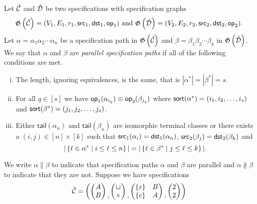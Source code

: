 \begin{definition}
Let $\check{\mathcal{C}}$ and $\check{\mathcal{D}}$ be two specifications with specification graphs 
\[
\mathfrak{G}\left(\check{\mathcal{C}}\right)=(V_1,E_1,r_1,\textsf{src}_1,\textsf{dst}_1,\textsf{op}_1) \text{ and } \mathfrak{G}\left(\check{\mathcal{D}}\right) = (V_2,E_2,r_2,\textsf{src}_2,\textsf{dst}_2,\textsf{op}_2).
\]
Let $\alpha=\alpha_1\alpha_2 \dotsm \alpha_n$ be a specification path in $\mathfrak{G}\left(\check{\mathcal{C}}\right)$ and $\beta=\beta_1\beta_2 \dotsm \beta_k$ in $\mathfrak{G}\left(\check{\mathcal{D}}\right)$. We say that $\alpha$ and $\beta$ are \emph{parallel specification paths} if all of the following conditions are met.
\begin{enumerate}[i.]
    \item The length, ignoring equivalences, is the same, that is $|\alpha^\ast| = |\beta^\ast| = s$.
    \item For all $q\in[s]$ we have $\textsf{op}_1(\alpha_{i_q}) \equiv \textsf{op}_2(\beta_{j_q})$ where $\textsf{sort}(\alpha^\ast) = (i_1,i_2,\dotsc,i_s)$ and $\textsf{sort}(\beta^\ast) = (j_1,j_2,\dotsc,j_s)$.
    \item Either $\textsf{tail}(\alpha_n)$ and $\textsf{tail}(\beta_n)$ are isomorphic terminal classes or there exists a $(i,j) \in [n] \times [k]$ such that $\textsf{src}_1(\alpha_i) = \textsf{dst}_1(\alpha_n)$, $\textsf{src}_2(\beta_j) = \textsf{dst}_2(\beta_k)$ and
    \[
        |\left\{\ell \in \alpha^\ast \mid i \leq \ell \leq n\right\}| = |\left\{\ell \in \beta^\ast \mid j \leq \ell \leq k\right\}|.
    \]
\end{enumerate}
\end{definition}
We write $\alpha \parallel \beta$ to indicate that specification paths $\alpha$ and $\beta$ are parallel and $\alpha \nparallel \beta$ to indicate that they are not. Suppose we have specifications
\[
    \check{\mathcal{C}} = \left(
        \begin{pmatrix}
            A\\
            B
        \end{pmatrix}
        \begin{matrix}\\,\end{matrix}
        \begin{pmatrix}
            \sqcup\\
            \times
        \end{pmatrix}
        \begin{matrix}\\,\end{matrix}
        \begin{pmatrix}
            \left\{\varepsilon\right\} & B\\
            \left\{c\right\} & A
        \end{pmatrix}
        \begin{matrix}\\,\end{matrix}
        \begin{pmatrix}
            2\\
            2
        \end{pmatrix}
    \right)
\]
